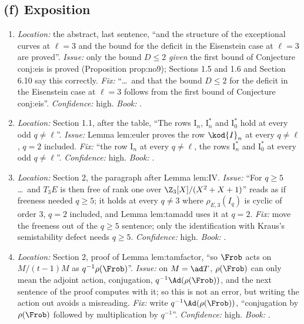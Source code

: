 \begin{sloppypar}
\subsection*{(f) Exposition}
\begin{enumerate}[resume*=errata]
\item\label{err:paper:abstract-eis} \emph{Location:} the abstract, last sentence, ``and the structure of the exceptional curves at $\ell=3$ and the bound for the deficit in the Eisenstein case at $\ell=3$ are
proved''. \emph{Issue:} only the bound $D\le2$ \emph{given} the first bound of Conjecture conj:eis is proved (Proposition prop:no9); Sections 1.5 and 1.6 and Section 6.10 say this correctly. \emph{Fix:} ``\dots\ and that
the bound $D\le2$ for the deficit in the Eisenstein case at $\ell=3$ follows from the first bound of Conjecture conj:eis''. \emph{Confidence:} high. \emph{Book:} .
\item\label{err:paper:rows} \emph{Location:} Section 1.1, after the table, ``The rows $\mathrm{I}_n$, $\mathrm{I}_n^*$ and $\mathrm{I}_0^*$ hold at every odd $q\ne\ell$''. \emph{Issue:} Lemma lem:euler proves the row $\kod{I}_n$ at every $q\ne\ell$,
$q=2$ included. \emph{Fix:} ``the row $\mathrm{I}_n$ at every $q\ne\ell$, the rows $\mathrm{I}_n^*$ and $\mathrm{I}_0^*$ at every odd $q\ne\ell$''. \emph{Confidence:} high. \emph{Book:} .
\item\label{err:paper:freeness} \emph{Location:} Section 2, the paragraph after Lemma lem:IV. \emph{Issue:} ``For $q\ge5$ \dots\ and $T_3E$ is then free of rank one over $\Z_3[X]/(X^2+X+1)$'' reads as if freeness needed
$q\ge5$; it holds at every $q\ne3$ where $\rho_{E,3}(I_q)$ is cyclic of order $3$, $q=2$ included, and Lemma lem:tamadd uses it at $q=2$. \emph{Fix:} move the freeness out of the $q\ge5$ sentence;
only the identification with Kraus's semistability defect needs $q\ge5$. \emph{Confidence:} high. \emph{Book:} .
\item\label{err:paper:ad-frob} \emph{Location:} Section 2, proof of Lemma lem:tamfactor, ``so $\Frob$ acts on $M/(t-1)M$ as $q^{-1}\rho(\Frob)$''. \emph{Issue:} on $M=\ad T$, $\rho(\Frob)$ can only mean the adjoint action, conjugation,
$q^{-1}\Ad(\rho(\Frob))$, and the next sentence of the proof computes with it; so this is not an error, but writing the action out avoids a misreading. \emph{Fix:} write $q^{-1}\Ad(\rho(\Frob))$, ``conjugation by $\rho(\Frob)$
followed by multiplication by $q^{-1}$''. \emph{Confidence:} high. \emph{Book:} .

\end{enumerate}
\end{sloppypar}
